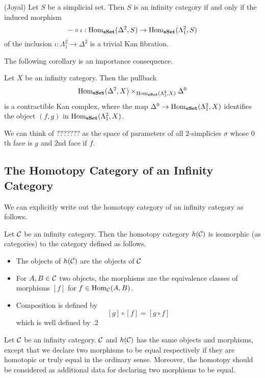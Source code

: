 \documentclass[a4paper]{article}
\begin{document}
\begin{thm}{(Joyal)}{} Let $S$ be a simplicial set. Then $S$ is an infinity category if and only if the induced morphism $$-\circ\iota:\operatorname{Hom}_\bold{sSet}(\Delta^2,S)\to\operatorname{Hom}_\bold{sSet}(\Lambda_1^2,S)$$ of the inclusion $\iota:\Lambda_1^2\to\Delta^2$ is a trivial Kan fibration. 
\end{thm}

The following corollary is an importance consequence. 

\begin{crl}{}{} Let $X$ be an infinity category. Then the pullback $$\operatorname{Hom}_\bold{sSet}(\Delta^2,X)\times_{\operatorname{Hom}_\bold{sSet}(\Lambda_1^2,X)}\Delta^0$$ is a contractible Kan complex, where the map $\Delta^0\to\operatorname{Hom}_\bold{sSet}(\Lambda_1^2,X)$ identifies the object $(f,g)$ in $\operatorname{Hom}_\bold{sSet}(\Lambda_1^2,X)$. 
\end{crl}

We can think of ??????? as the space of parameters of all $2$-simplicies $\sigma$ whose $0$th face is $g$ and $2$nd face if $f$. 

\subsection{The Homotopy Category of an Infinity Category}
We can explicitly write out the homotopy category of an infinity category as follows. 

\begin{prp}{}{} Let $\mathcal{C}$ be an infinity category. Then the homotopy category $h(\mathcal{C})$ is isomorphic (as categories) to the category defined as follows. 
\begin{itemize}
\item The objects of $h(\mathcal{C})$ are the objects of $\mathcal{C}$
\item For $A,B\in\mathcal{C}$ two objects, the morphisms are the equivalence classes of morphisms $[f]$ for $f\in\operatorname{Hom}_{\mathcal{C}}(A,B)$. 
\item Composition is defined by $$[g]\circ[f]=[g\circ f]$$ which is well defined by .2
\end{itemize}
\end{prp}

Let $\mathcal{C}$ be an infinity category. $\mathcal{C}$ and $h(\mathcal{C})$ has the same objects and morphisms, except that we declare two morphisms to be equal respectively if they are homotopic or truly equal in the ordinary sense. Moreover, the homotopy should be considered as additional data for declaring two morphisms to be equal. \\
\end{document}
